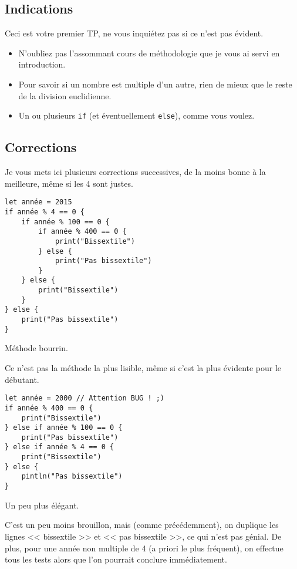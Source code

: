 \subsection{Indications}

Ceci est votre premier TP, ne vous inquiétez pas si ce n'est pas évident.

\begin{itemize}

\item N'oubliez pas l'assommant cours de méthodologie que je vous ai servi en introduction.

\item Pour savoir si un nombre est multiple d'un autre,
rien de mieux que le reste de la division euclidienne.

\item Un ou plusieurs \texttt{if} (et éventuellement \texttt{else}), comme vous voulez.
\end{itemize}
\pagebreak %
\subsection{Corrections}
Je vous mets ici plusieurs corrections successives,
de la moins bonne à la meilleure, même si les 4 sont justes.

\begin{listing}[h!]
\begin{verbatim}
let année = 2015
if année % 4 == 0 {
    if année % 100 == 0 {
        if année % 400 == 0 {
            print("Bissextile")
        } else {
            print("Pas bissextile")
        }
    } else {
        print("Bissextile")
    }
} else {
    print("Pas bissextile")
}
\end{verbatim}
\caption{Méthode bourrin.}
\end{listing}
Ce n'est pas la méthode la plus lisible,
même si c'est la plus évidente pour le débutant.

\begin{listing}[h!]
\begin{verbatim}
let année = 2000 // Attention BUG ! ;)
if année % 400 == 0 {
    print("Bissextile")
} else if année % 100 == 0 {
    print("Pas bissextile")
} else if année % 4 == 0 {
    print("Bissextile")
} else {
    pintln("Pas bissextile")
}
\end{verbatim}
\caption{Un peu plus élégant.}
\end{listing}
C'est un peu moins brouillon, mais (comme précédemment), on duplique les lignes << bissextile >> et << pas bissextile >>, ce qui n'est pas génial. De plus, pour une année non multiple de 4 (a priori le plus fréquent), on effectue tous les tests alors que l'on pourrait conclure immédiatement.

